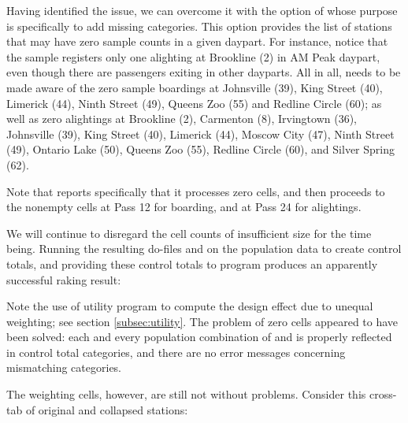 Having identified the issue, we can overcome it with the  option
of  whose purpose is specifically to add missing categories.
This option provides the list of stations that may have zero sample counts
in a given daypart.
For instance, notice that the sample registers only one alighting at Brookline (2)
in AM Peak daypart, even though there are passengers exiting in other dayparts. All in all,
 needs to be made aware of the zero sample boardings at
Johnsville (39), King Street (40), Limerick (44), Ninth Street (49),
Queens Zoo (55) and Redline Circle (60); as well as zero alightings at Brookline (2),
Carmenton (8), Irvingtown (36),
Johnsville (39), King Street (40), Limerick (44), Moscow City (47), Ninth Street (49),
Ontario Lake (50), Queens Zoo (55), Redline Circle (60), and Silver Spring (62).

\cnp

\begin{stlog}
\nullskip
\end{stlog}

Note that  reports specifically that it processes zero cells,
and then proceeds to the nonempty cells at Pass 12 for boarding, and at Pass 24 for alightings.

We will continue to disregard the cell counts of insufficient size for the time being.
Running the resulting do-files  and 
on the population data to create control totals, and providing these control totals
to  program produces an apparently successful raking result:

\noindent
\begin{stlog}
\nullskip
\end{stlog}

Note the use of utility program  to compute the design effect
due to unequal weighting; see section \ref{subsec:utility}. The problem of zero cells
appeared to have been solved: each and every population combination of  
and  is properly reflected in control total categories, and there are
no error messages concerning mismatching categories.

The weighting cells, however, are still not without problems. Consider this
cross-tab of original and collapsed stations:

\begin{stlog}
\nullskip
\end{stlog}

